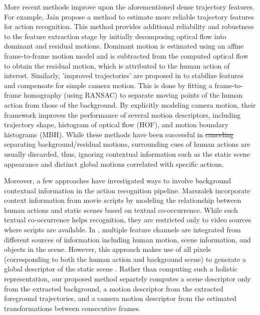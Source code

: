 More recent methods improve upon the aforementioned dense trajectory features. For example, Jain \etal \cite{jain2013} propose a method to estimate more reliable trajectory features for action recognition. This method provides additional reliability and robustness to the feature extraction stage by initially decomposing optical flow into dominant and residual motions. Dominant motion is estimated using an affine frame-to-frame motion model and is subtracted from the computed optical flow to obtain the residual motion, which is attributed to the human action of interest. Similarly, 'improved trajectories' are proposed in \cite{wang2013} to stabilize features and compensate for simple camera motion. This is done by fitting a frame-to-frame homography (using RANSAC) to separate moving points of the human action from those of the background. By explicitly modeling camera motion, their  framework improves the performance of several motion descriptors, including trajectory shape, histogram of optical flow (HOF), and motion boundary histograms (MBH). While these methods have been successful in \st{canceling} separating  background/residual motions, surrounding cues of human actions are usually discarded, thus, ignoring contextual information such as the static scene appearance and distinct global motions correlated with specific actions.

Moreover, a few approaches have investigated ways to involve background contextual information in the action recognition pipeline. Marszalek \etal \cite{marszalek2009} incorporate context information from movie scripts by modeling the relationship between human actions and static scenes based on textual co-occurrence. While such textual co-occurrence helps recognition, they are restricted only to video sources where scripts are available. In \cite{ikizler2010}, multiple feature channels are integrated from different sources of information including human motion, scene information, and objects in the scene. However, this approach makes use of all pixels (corresponding to both the human action and background scene) to generate a global descriptor of the static scene \cite{oliva2001}. Rather than computing such a holistic representation, our proposed method separtely computes a scene descriptor only from the extracted background, a motion descriptor from the extracted foreground trajectories, and a camera motion descriptor from the estimated transformations between consecutive frames.

